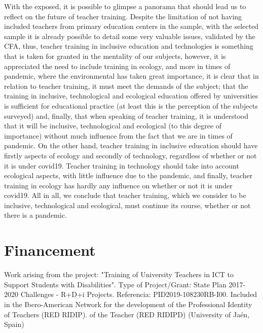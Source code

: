 \documentclass[english]{textolivre}
\begin{document}
With the exposed, it is possible to glimpse a panorama that should lead us to reflect on the future of teacher training. Despite the limitation of not having included teachers from primary education centers in the sample, with the selected sample it is already possible to detail some very valuable issues, validated by the CFA, thus, teacher training in inclusive education and technologies is something that is taken for granted in the mentality of our subjects, however, it is appreciated the need to include training in ecology, and more in times of pandemic, where the environmental has taken great importance, it is clear that in relation to teacher training, it must meet the demands of the subject; that the training in inclusive, technological and ecological education offered by universities is sufficient for educational practice (at least this is the perception of the subjects surveyed) and, finally, that when speaking of teacher training, it is understood that it will be inclusive, technological and ecological (to this degree of importance) without much influence from the fact that we are in times of pandemic. On the other hand, teacher training in inclusive education should have firstly aspects of ecology and secondly of technology, regardless of whether or not it is under covid19. Teacher training in technology should take into account ecological aspects, with little influence due to the pandemic, and finally, teacher training in ecology has hardly any influence on whether or not it is under covid19. All in all, we conclude that teacher training, which we consider to be inclusive, technological and ecological, must continue its course, whether or not there is a pandemic.

\section{Financement}

Work arising from the project: "Training of University Teachers in ICT to Support Students with Disabilities". Type of Project/Grant: State Plan 2017-2020 Challenges - R+D+i Projects. Referencia: PID2019-108230RB-I00. Included in the Ibero-American Network for the development of the Professional Identity of Teachers (RED RIDIP). of the Teacher (RED RIDIPD) (University of Jaén, Spain)



\printbibliography\label{sec-bib}
\end{document}
